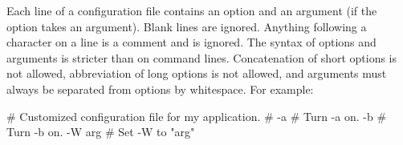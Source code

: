 Each line of a configuration file contains an option and an argument
(if the option takes an argument). Blank lines are ignored.  Anything
following a \ccode{\#} character on a line is a comment and is
ignored. The syntax of options and arguments is stricter than on
command lines.  Concatenation of short options is not allowed,
abbreviation of long options is not allowed, and arguments must always
be separated from options by whitespace. For example:

\begin{cchunk}
   # Customized configuration file for my application.
   #
   -a             # Turn -a on.
   -b             # Turn -b on.
   -W arg         # Set -W to "arg"
\end{cchunk}





